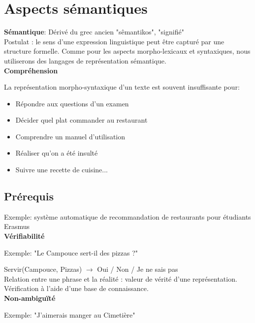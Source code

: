 \vspace{-1.2cm}

\section{Aspects sémantiques}

\textbf{Sémantique}: Dérivé du grec ancien "sêmantikos", "signifié" \\

Postulat : le sens d'une expression linguistique peut être capturé par une structure formelle. Comme pour les aspects morpho-lexicaux et syntaxiques, nous utiliserons des langages de représentation sémantique.\\

\textbf{Compréhension}

La représentation morpho-syntaxique d'un texte est souvent insuffisante pour:

\begin{itemize}
    \item Répondre aux questions d'un examen
    \item Décider quel plat commander au restaurant
    \item Comprendre un manuel d'utilisation
    \item Réaliser qu'on a été insulté
    \item Suivre une recette de cuisine...
\end{itemize}

\subsection{Prérequis}

Exemple: système automatique de recommandation de restaurants pour étudiants Erasmus \\

\textbf{Vérifiabilité}

Exemple: "Le Campouce sert-il des pizzas ?"

Servir(Campouce, Pizzas) $\rightarrow$ Oui / Non / Je ne sais pas \\

Relation entre une phrase et la réalité : valeur de vérité d'une représentation. Vérification à l'aide d'une base de connaissance.\\

\textbf{Non-ambiguïté}

Exemple: "J'aimerais manger au Cimetière" \\

